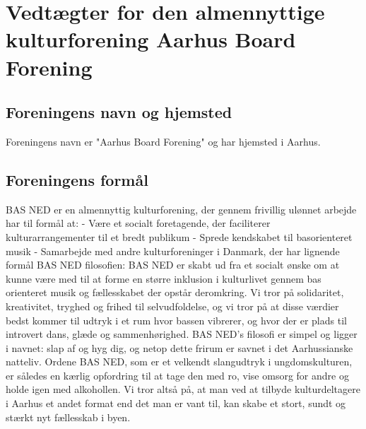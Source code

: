 \documentclass[working, oneside]{tuftebook}
\begin{document}
\thispagestyle{fancy}
\chapter{Vedtægter for den almennyttige kulturforening Aarhus Board Forening}
\section{Foreningens navn og hjemsted}
Foreningens navn er "Aarhus Board Forening" og har hjemsted i Aarhus.
\section{Foreningens formål}
BAS NED er en almennyttig kulturforening, der gennem frivillig ulønnet arbejde har til
formål at:
- Være et socialt foretagende, der faciliterer kulturarrangementer til et bredt
publikum
- Sprede kendskabet til basorienteret musik
- Samarbejde med andre kulturforeninger i Danmark, der har lignende formål
BAS NED filosofien:
BAS NED er skabt ud fra et socialt ønske om at kunne være med til at forme en større
inklusion i kulturlivet gennem bas orienteret musik og fællesskabet der opstår deromkring.
Vi tror på solidaritet, kreativitet, tryghed og frihed til selvudfoldelse, og vi tror på at disse
værdier bedst kommer til udtryk i et rum hvor bassen vibrerer, og hvor der er plads til
introvert dans, glæde og sammenhørighed. BAS NED’s filosofi er simpel og ligger i
navnet: slap af og hyg dig, og netop dette frirum er savnet i det Aarhussianske natteliv.
Ordene BAS NED, som er et velkendt slangudtryk i ungdomskulturen, er således en kærlig
opfordring til at tage den med ro, vise omsorg for andre og holde igen med alkohollen. Vi
tror altså på, at man ved at tilbyde kulturdeltagere i Aarhus et andet format end det man er
vant til, kan skabe et stort, sundt og stærkt nyt fællesskab i byen.
\end{document}
